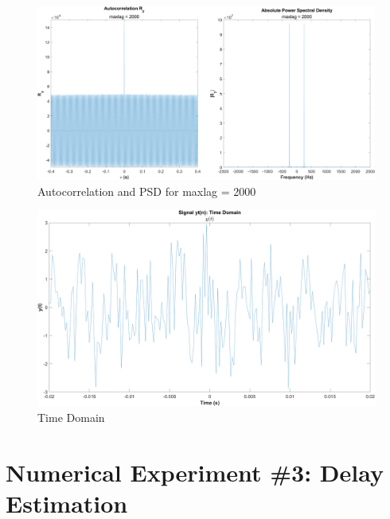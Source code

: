 \documentclass[12pt]{article}
\begin{document}
\begin{figure}[h]
	\centering
	\includegraphics[width=\textwidth]{exp2_maxlag_2000}
	\caption{\label{fig:exp2_maxlag2000}Autocorrelation and PSD for maxlag = 2000}
\end{figure}


\begin{figure}[h]
	\centering
	\includegraphics[width=\textwidth]{exp2_time}
	\caption{\label{fig:exp2_time}Time Domain}
\end{figure}

\section*{Numerical Experiment \#3: Delay Estimation}

\end{document}
